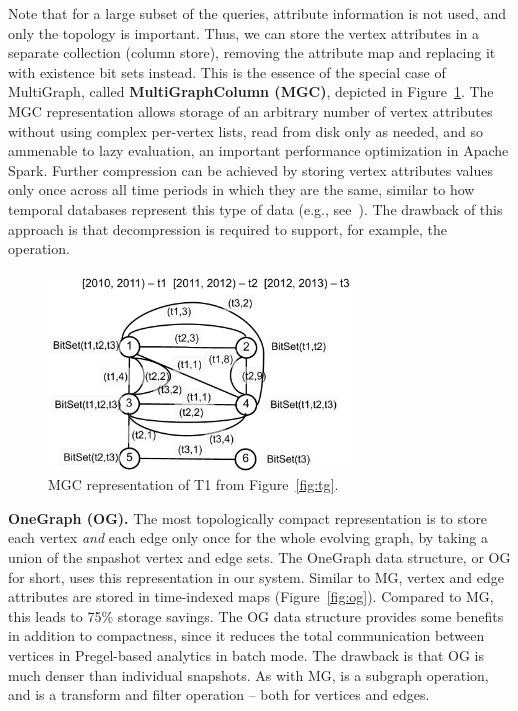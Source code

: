 Note that for a large subset of the queries, attribute information is
not used, and only the topology is important.  Thus, we can store the
vertex attributes in a separate collection (column store), removing
the attribute map and replacing it with existence bit sets instead.
This is the essence of the special case of MultiGraph, called {\bf
  MultiGraphColumn (MGC)}, depicted in Figure~\ref{fig:mgc}.  The MGC
representation allows storage of an arbitrary number of vertex
attributes without using complex per-vertex lists, read from disk only
as needed, and so ammenable to lazy evaluation, an important
performance optimization in Apache Spark.  Further compression can be
achieved by storing vertex attributes values only once across all time
periods in which they are the same, similar to how temporal databases
represent this type of data (e.g., see~\cite{Muller2008}).  The
drawback of this approach is that decompression is required to
support, for example, the  operation.

\begin{figure}[t!]
\includegraphics[width=3.2in]{figs/mgc.pdf}
\caption{MGC representation of T1 from Figure~\ref{fig:tg}.}
\label{fig:mgc}
\end{figure}

{\bf OneGraph (OG).}  The most topologically compact representation is
to store each vertex {\em and} each edge only once for the whole
evolving graph, by taking a union of the snpashot vertex and edge
sets.  The OneGraph data structure, or OG for short, uses this
representation in our system.  Similar to MG, vertex and edge
attributes are stored in time-indexed maps (Figure~\ref{fig:og}).
Compared to MG, this leads to 75\% storage savings.  The OG data
structure provides some benefits in addition to compactness, since it
reduces the total communication between vertices in Pregel-based
analytics in batch mode.  The drawback is that OG is much denser than
individual snapshots.  As with MG,  is a subgraph
operation, and  is a transform and filter operation --
both for vertices and edges.

